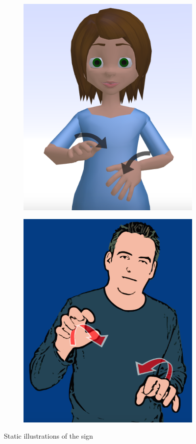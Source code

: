 \documentclass[12pt]{ociamthesis}  %
\begin{document}
\begin{figure}[H]
\centering
\begin{subfigure}[b]{.5\textwidth}
	\captionsetup{width=0.8\textwidth}
  \centering
  \includegraphics[width=0.7\linewidth]{chapter6/animal2}
  \caption{}
\end{subfigure}%
\begin{subfigure}[b]{.5\textwidth}
 \captionsetup{width=0.8\textwidth}
  \centering
  \includegraphics[width=0.7\linewidth]{chapter6/animal1}
  \caption{}
\end{subfigure}
\caption{Static illustrations of the sign }
\label{fig:storyboard}
\end{figure}
\end{document}
